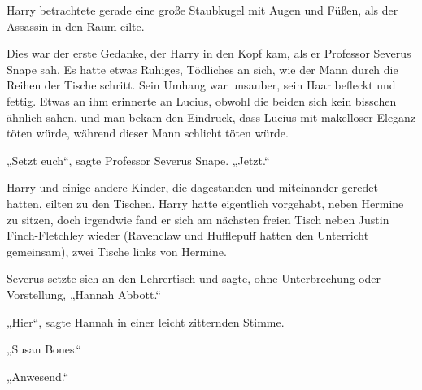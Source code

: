 Harry betrachtete gerade eine große Staubkugel mit Augen und Füßen, als der Assassin in den Raum eilte.

Dies war der erste Gedanke, der Harry in den Kopf kam, als er Professor Severus Snape sah. Es hatte etwas Ruhiges, Tödliches an sich, wie der Mann durch die Reihen der Tische schritt. Sein Umhang war unsauber, sein Haar befleckt und fettig. Etwas an ihm erinnerte an Lucius, obwohl die beiden sich kein bisschen ähnlich sahen, und man bekam den Eindruck, dass Lucius mit makelloser Eleganz töten würde, während dieser Mann schlicht töten würde.

„Setzt euch“, sagte Professor Severus Snape. „Jetzt.“

Harry und einige andere Kinder, die dagestanden und miteinander geredet hatten, eilten zu den Tischen. Harry hatte eigentlich vorgehabt, neben Hermine zu sitzen, doch irgendwie fand er sich am nächsten freien Tisch neben Justin Finch-Fletchley wieder (Ravenclaw und Hufflepuff hatten den Unterricht gemeinsam), zwei Tische links von Hermine.

Severus setzte sich an den Lehrertisch und sagte, ohne Unterbrechung oder Vorstellung, „Hannah Abbott.“

„Hier“, sagte Hannah in einer leicht zitternden Stimme.

„Susan Bones.“

„Anwesend.“


